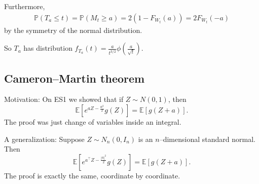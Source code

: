 \documentclass{article}
\theoremstyle{definition}
\begin{document}
Furthermore,
\begin{align*}
    \mathbb{P}(T_a\le t) = \mathbb{P}(M_t \ge a) = 2(1-F_{W_t}(a)) = 2F_{W_t}(-a)
\end{align*}
by the symmetry of the normal distribution.
\vspace{1mm}

So $T_a$ has distribution $f_{T_a}(t) = \frac{a}{t^{3/2}}\phi(\frac{a}{\sqrt{t}})$.

\subsection{Cameron--Martin theorem}

Motivation: On ES1 we showed that if $Z \sim N(0,1)$, then \[
\mathbb{E}[e^{aZ-\frac{a^2}{2}}g(Z)] = \mathbb{E}[g(Z+a)].
\]
The proof was just change of variables inside an integral.
\vspace{1mm}

A generalization: Suppose $Z \sim N_n(0,I_n)$ is an $n$--dimensional standard normal. Then \[
\mathbb{E}[e^{a^\top Z-\frac{|a|^2}{2}}g(Z)] = \mathbb{E}[g(Z+a)].
\]
The proof is exactly the same, coordinate by coordinate.
\end{document}
